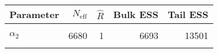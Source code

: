 \begin{table}[!h]
\centering
\begin{tabular}{>{\raggedright\arraybackslash}p{2cm}rrrr}
\toprule
Parameter & $N_{\text{eff}}$ & $\widehat{R}$ & Bulk ESS & Tail ESS\\
\midrule
\cellcolor{gray!6}{$\alpha_{0}$} & \cellcolor{gray!6}{5911} & \cellcolor{gray!6}{1} & \cellcolor{gray!6}{5946} & \cellcolor{gray!6}{10635}\\
$\alpha_{2}$ & 6680 & 1 & 6693 & 13501\\
\cellcolor{gray!6}{$\rho$} & \cellcolor{gray!6}{4737} & \cellcolor{gray!6}{1} & \cellcolor{gray!6}{4767} & \cellcolor{gray!6}{4389}\\
\bottomrule
\end{tabular}
\end{table}